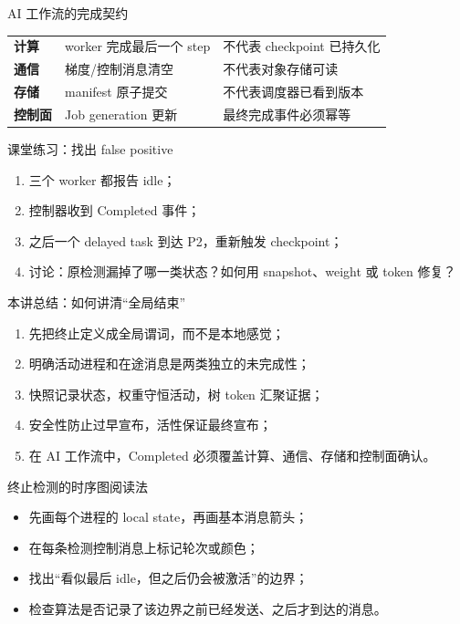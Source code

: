 \documentclass[UTF8,fontset=none,aspectratio=169,10pt]{beamer}
\begin{document}
\begin{frame}{AI 工作流的完成契约}
\begin{tabularx}{\linewidth}{>{\bfseries}p{3cm}XX}
\toprule
计算 & worker 完成最后一个 step & 不代表 checkpoint 已持久化 \\
通信 & 梯度/控制消息清空 & 不代表对象存储可读 \\
存储 & manifest 原子提交 & 不代表调度器已看到版本 \\
控制面 & Job generation 更新 & 最终完成事件必须幂等 \\
\bottomrule
\end{tabularx}
\end{frame}

\begin{frame}{课堂练习：找出 false positive}
\begin{enumerate}
  \item 三个 worker 都报告 idle；
  \item 控制器收到 Completed 事件；
  \item 之后一个 delayed task 到达 P2，重新触发 checkpoint；
  \item 讨论：原检测漏掉了哪一类状态？如何用 snapshot、weight 或 token 修复？
\end{enumerate}
\end{frame}

\begin{frame}{本讲总结：如何讲清“全局结束”}
\begin{enumerate}
  \item 先把终止定义成全局谓词，而不是本地感觉；
  \item 明确活动进程和在途消息是两类独立的未完成性；
  \item 快照记录状态，权重守恒活动，树 token 汇聚证据；
  \item 安全性防止过早宣布，活性保证最终宣布；
  \item 在 AI 工作流中，Completed 必须覆盖计算、通信、存储和控制面确认。
\end{enumerate}
\vfill
{}
\end{frame}

\begin{frame}{终止检测的时序图阅读法}
\begin{itemize}
  \item 先画每个进程的 local state，再画基本消息箭头；
  \item 在每条检测控制消息上标记轮次或颜色；
  \item 找出“看似最后 idle，但之后仍会被激活”的边界；
  \item 检查算法是否记录了该边界之前已经发送、之后才到达的消息。
\end{itemize}
\vfill
{}
\end{frame}
\end{document}
